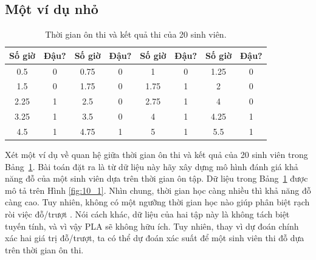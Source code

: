 \subsection{Một ví dụ nhỏ}
\begin{table}[]
\centering
\caption{Thời gian ôn thi và kết quả thi của 20 sinh viên. }
\label{tab:10_1}
\begin{tabular}{|c|c||c|c||c|c||c|c|}
\hline
\textbf{Số giờ} & \textbf{Đậu?} & \textbf{Số giờ} & \textbf{Đậu?} & \textbf{Số giờ} & \textbf{Đậu?} & \textbf{Số giờ} & \textbf{Đậu?} \\ \hline \hline
0.5            & 0             & 0.75           & 0             & 1              & 0             & 1.25           & 0             \\ \hline
1.5            & 0             & 1.75           & 0             & 1.75           & 1             & 2              & 0             \\ \hline
2.25           & 1             & 2.5            & 0             & 2.75           & 1             & 4              & 0             \\ \hline
3.25           & 1             & 3.5            & 0             & 4              & 1             & 4.25           & 1             \\ \hline
4.5            & 1             & 4.75           & 1             & 5              & 1             & 5.5            & 1             \\ \hline
\end{tabular}
\end{table}

Xét một ví dụ về quan hệ giữa thời gian ôn thi và kết quả của 20 sinh
viên trong Bảng~\ref{tab:10_1}. Bài toán đặt ra là từ dữ liệu này hãy
xây dựng mô hình đánh giá khả năng đỗ của một sinh viên dựa trên thời gian
ôn tập. Dữ liệu trong Bảng~\ref{tab:10_1} được mô tả trên Hình \ref{fig:10_1}.
Nhìn chung, thời gian học càng nhiều thì khả năng đỗ càng cao. Tuy nhiên, không
có một ngưỡng thời gian học nào giúp phân biệt rạch ròi việc đỗ/trượt . Nói cách
khác, dữ liệu của hai tập này là không tách biệt tuyến tính, và vì vậy PLA sẽ
không hữu ích. Tuy nhiên, thay vì dự đoán chính xác hai giá trị đỗ/trượt,
ta có thể dự đoán xác suất để một sinh viên thi đỗ dựa trên thời gian ôn thi.

